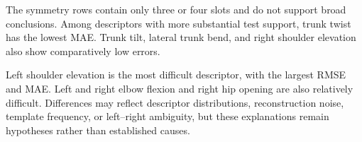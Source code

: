 \begin{table}[t]
    \centering
    \caption{Teacher-forced angle-slot regression grouped by target
    descriptor.}
    \label{tab:metric_results}
\end{table}

The symmetry rows contain only three or four slots and do not support
broad conclusions. Among descriptors with more substantial test
support, trunk twist has the lowest MAE. Trunk tilt, lateral trunk bend,
and right shoulder elevation also show comparatively low errors.

Left shoulder elevation is the most difficult descriptor, with the
largest RMSE and MAE. Left and right elbow flexion and right hip opening
are also relatively difficult. Differences may reflect descriptor
distributions, reconstruction noise, template frequency, or
left--right ambiguity, but these explanations remain hypotheses rather
than established causes.

